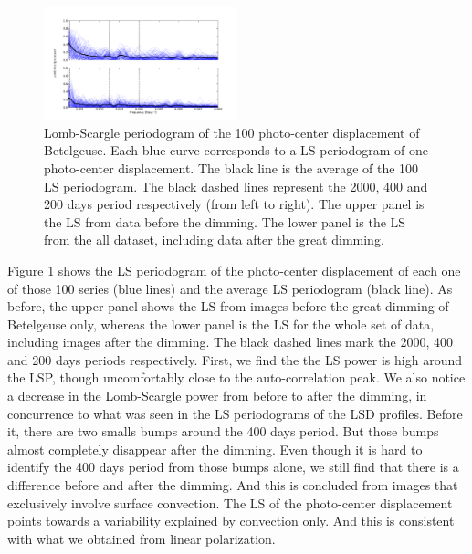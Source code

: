 \documentclass{aa}
\begin{document}
\begin{figure}[!h]
    \centering
    \includegraphics[width=0.5\textwidth]{Lomb-Scargle Photo-center.png}
    \caption{Lomb-Scargle periodogram of the 100 photo-center displacement of Betelgeuse. Each blue curve corresponds to a LS periodogram of one photo-center
     displacement. The black line is the average of the 100 LS periodogram. The black dashed lines represent the 2000, 400 and 200 days period respectively 
     (from left to right). The upper panel is the LS from data before the dimming. The lower panel is the LS from the all dataset, 
     including data after the great dimming. }
    \label{LS photocenter}
\end{figure}

Figure \ref{LS photocenter} shows the LS periodogram of the photo-center displacement  of each one of those 100 series (blue lines) and the average LS periodogram (black line). 
As before, the upper panel shows the LS from images before the great dimming of Betelgeuse only, whereas the lower panel is the LS for the whole set of 
data,  including images after the dimming. The black dashed lines mark the 2000, 400 and 
200 days periods respectively. First, we find the the LS power is high around the LSP, though
uncomfortably close to the auto-correlation peak.
We also notice a decrease in the Lomb-Scargle power from  before to after the dimming, in 
concurrence to what was seen in the LS periodograms of the LSD profiles. Before it, there are two smalls bumps around the 400 days period. 
But those bumps almost completely disappear after the dimming. Even though it is 
hard to identify the 400 days period from those bumps alone,
we still find that there is a difference before and after the dimming. 
And this is concluded  from images that exclusively involve surface convection.
The LS of the photo-center displacement points towards a variability explained by convection only. 
And this is consistent with what we obtained from linear polarization.
\end{document}
